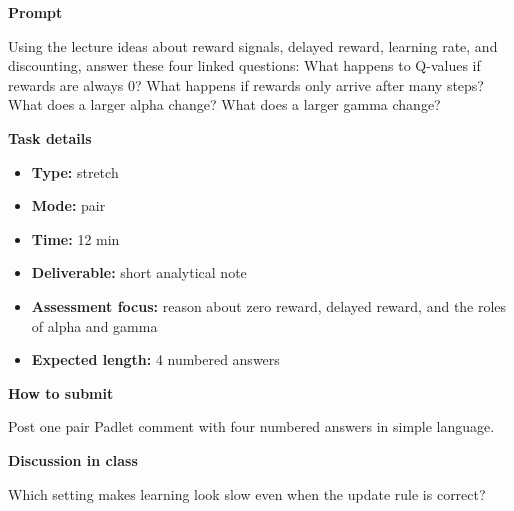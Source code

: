 \documentclass[11pt]{article}
\begin{document}
\begin{tcolorbox}[colback=white,colframe=MidnightBlue,title={Q4 Stretch Extension},fonttitle=\bfseries,breakable]
\begin{center}
\end{center}

{\large\bfseries\color{MidnightBlue} Prompt}\par\medskip
Using the lecture ideas about reward signals, delayed reward, learning rate, and discounting, answer these four linked questions: What happens to Q-values if rewards are always 0? What happens if rewards only arrive after many steps? What does a larger alpha change? What does a larger gamma change?

{\large\bfseries\color{MidnightBlue} Task details}\par\medskip
\begin{itemize}\item \textbf{Type:} stretch
\item \textbf{Mode:} pair
\item \textbf{Time:} 12 min
\item \textbf{Deliverable:} short analytical note
\item \textbf{Assessment focus:} reason about zero reward, delayed reward, and the roles of alpha and gamma
\item \textbf{Expected length:} 4 numbered answers\end{itemize}

{\large\bfseries\color{MidnightBlue} How to submit}\par\medskip
Post one pair Padlet comment with four numbered answers in simple language.

{\large\bfseries\color{MidnightBlue} Discussion in class}\par\medskip
Which setting makes learning look slow even when the update rule is correct?


\end{tcolorbox}
\end{document}
